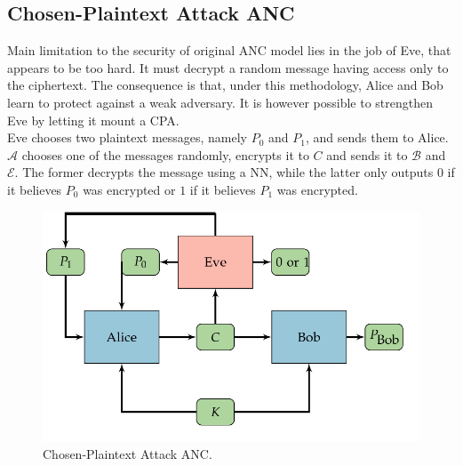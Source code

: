 \documentclass[%
    corpo=11pt,
    twoside,
    stile=classica,
    oldstyle,
    autoretitolo,
    tipotesi=magistrale,
    greek,
    evenboxes,
    english
]{toptesi}
\begin{document}
\subsection{Chosen-Plaintext Attack ANC}
\label{cpaanc}
Main limitation to the security of original ANC model lies in the job of Eve, that appears to be too hard. It must decrypt a random message having access only to the ciphertext. The consequence is that, under this methodology, Alice and Bob learn to protect against a weak adversary. It is however possible to strengthen Eve by letting it mount a CPA.  \\
Eve chooses two plaintext messages, namely $P_0$ and $P_1$, and sends them to Alice. $\mathcal{A}$ chooses one of the messages randomly, encrypts it to $C$ and sends it to $\mathcal{B}$ and $\mathcal{E}$. The former decrypts the message using a NN, while the latter only outputs $0$ if it believes $P_0$ was encrypted or $1$ if it believes $P_1$ was encrypted. \\
\begin{figure}[h]
\centering
\includegraphics[scale = 0.4]{pictures/cpa-anc.png}
\caption{Chosen-Plaintext Attack ANC.}
\label{fig:artificialneuron}
\end{figure}
\end{document}
